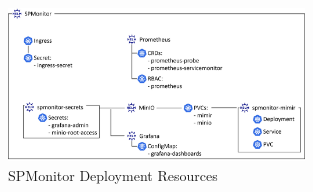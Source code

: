 \begin{figure}[tb]
  \centering
  \includegraphics[width=0.7\textwidth]{figures/spmonitor_resources.png}
  \caption{SPMonitor Deployment Resources}
  \label{fig:spmonitor_resources}
\end{figure}
